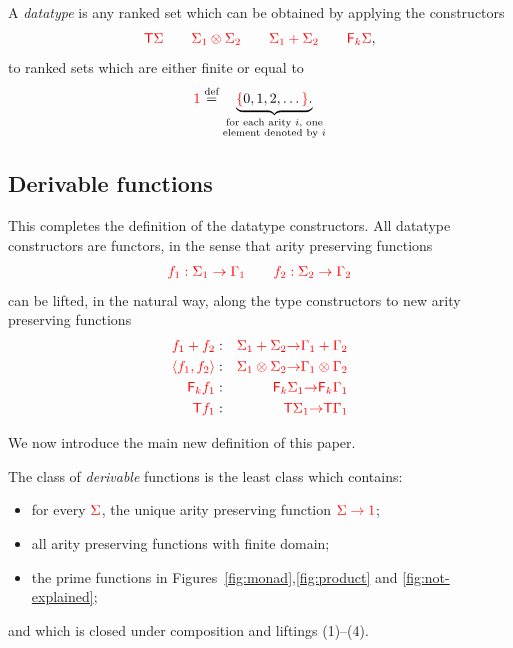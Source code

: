 \begin{definition}[Datatypes] \label{def:types} A \emph{datatype} is any ranked set which can be obtained by applying the constructors 
    \begin{align*}
    {\color{red}{{\color{red}{\mathsf T}}{\color{red}{\Sigma}}\qquad {\color{red}{\Sigma}}_1 \otimes {\color{red}{\Sigma}}_2 \qquad {\color{red}{\Sigma}}_1 + {\color{red}{\Sigma}}_2 \qquad {\color{red}{\mathsf F_{k}}}{\color{red}{\Sigma}}}},
    \end{align*}
    to ranked sets which are either finite or equal to 
    \begin{align*}
    {\color{red}{1}} \stackrel{\text{def}}=  \underbrace{{\color{red}{\{}}0, 1, 2,\ldots {\color{red}{\}}}.}_{\substack{\text{for each arity $i$, one} \\ \text{element denoted by $i$}}}
    \end{align*}
\end{definition}

\subsection{Derivable functions}
\smallskip
\newcommand{\funcitem}[3]{\ranked{#1  } &:& \ranked{#2} \rto  \ranked{#3}}
This completes the definition of the datatype constructors. 
All datatype constructors are functors, in the sense  that  arity preserving functions
\begin{align*}
{\color{red}{f_1 : \Sigma_1 \to \Gamma_1 \qquad f_2 : \Sigma_2 \to \Gamma_2}}
\end{align*}       
can be lifted, in the natural way, along the type constructors to new arity preserving  functions
\begin{eqnarray}
\label{eq:liftplus}\funcitem{f_1 + f_2}{\Sigma_1 + \Sigma_2}{\Gamma_1 + \Gamma_2} \\
\funcitem{\tensorpair{f_1,f_2}}{\Sigma_1 \otimes \Sigma_2}{\Gamma_1 \otimes \Gamma_2}\\
\funcitem{\reduce k f_1}{\reduce k \Sigma_1}{\reduce k \Gamma_1}\\
\funcitem{\tmonad f_1}{\tmonad \Sigma_1}{\tmonad \Gamma_1}
\end{eqnarray}

We now introduce the main new definition of this paper.

\begin{definition}
    The class of \emph{derivable} functions is the least class which contains:
    \begin{itemize}
    \item for every ${\color{red}{\Sigma}}$, the unique arity preserving function ${\color{red}{\Sigma \to {\color{red}{1}}}}$;
    \item  all arity preserving functions with finite domain;
        \item  the prime functions in Figures~\ref{fig:monad},\ref{fig:product} and \ref{fig:not-explained};
         \end{itemize}
and which is closed under composition and  liftings (1)--(4).
\end{definition}

